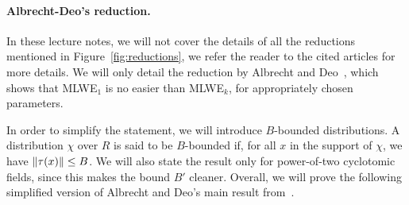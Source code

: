 \paragraph{Albrecht-Deo's reduction.} In these lecture notes, we will not cover the details of all the reductions mentioned in Figure~\ref{fig:reductions}, we refer the reader to the cited articles for more details. We will only detail the reduction by Albrecht and Deo~\cite{AD17}, which shows that MLWE$_{1}$ is no easier than MLWE$_{k}$, for appropriately chosen parameters.



In order to simplify the statement, we will introduce $B$-bounded distributions. A distribution $\chi$ over $R$ is said to be $B$-bounded if, for all $x$ in the support of $\chi$, we have $\|\tau(x)\| \leq B$. We will also state the result only for power-of-two cyclotomic fields, since this makes the bound $B'$ cleaner.
Overall, we will prove the following simplified version of Albrecht and Deo's main result from~\cite{AD17}.

